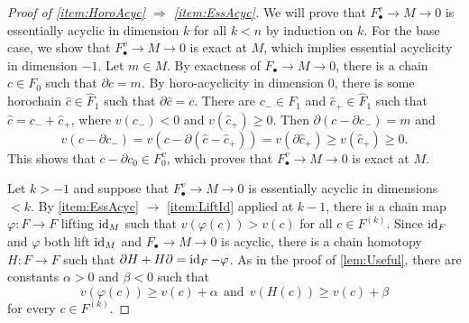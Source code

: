 \documentclass[11pt, letterpaper]{amsart}
\begin{document}
\begin{proof}[Proof of \ref{item:HoroAcyc} $\Longrightarrow$ \ref{item:EssAcyc}] We will prove that $F_\bullet^v \longrightarrow M \longrightarrow 0$ is essentially acyclic in dimension $k$ for all $k < n$ by induction on $k$. For the base case, we show that $F_\bullet^v \longrightarrow M \longrightarrow 0$ is exact at $M$, which implies essential acyclicity in dimension $-1$. Let $m \in M$. By exactness of $F_\bullet \longrightarrow M \longrightarrow 0$, there is a chain $c \in F_0$ such that $\partial c = m$. By horo-acyclicity in dimension $0$, there is some horochain $\hat{c} \in \widehat{F}_1$ such that $\partial \hat{c} = c$. There are $c_{-} \in F_1$ and $\hat{c}_+ \in \widehat{F}_1$ such that  $\hat{c} = c_{-} + \hat{c}_{+}$, where $v(c_{-}) < 0$ and $v(\hat{c}_{+}) \geqslant 0$. Then $\partial(c - \partial c_-) = m$ and 
\[
    v(c - \partial c_-) = v(c - \partial(\hat{c} - \hat{c}_+)) = v(\partial \hat{c}_+) \geqslant v(\hat{c}_+) \geqslant 0.
\]
This shows that $c - \partial c_0 \in F_0^v$, which proves that $F_\bullet^v \longrightarrow M \longrightarrow 0$ is exact at $M$.


Let $k > -1$ and suppose that $F_\bullet^v \longrightarrow M \longrightarrow 0$ is essentially acyclic in dimensions $< k$. By \ref{item:EssAcyc} $ \longrightarrow$ \ref{item:LiftId} applied at $k-1$, there is a chain map $\varphi \colon F \longrightarrow F$ lifting $\operatorname{id}_M$ such that $v(\varphi(c)) > v(c)$ for all $c \in F^{(k)}$. Since $\operatorname{id}_F$ and $\varphi$ both lift $\operatorname{id}_M$ and $F_\bullet \longrightarrow M \longrightarrow 0$ is acyclic, there is a chain homotopy $H \colon F \longrightarrow F$ such that $\partial H + H \partial = \operatorname{id}_{F} - \varphi$. As in the proof of \cref{lem:Useful}, there are constants $\alpha > 0$ and $\beta < 0$ such that 
\[
    v(\varphi(c)) \geqslant v(c) + \alpha \ \ \text{and} \ \ v(H(c)) \geqslant v(c) + \beta
\]
for every $c \in F^{(k)}$.


\end{proof}
\end{document}
